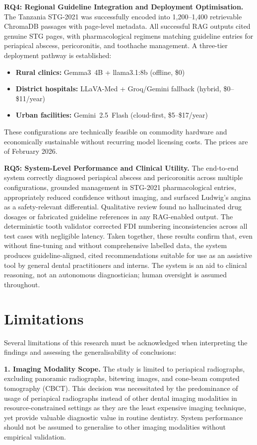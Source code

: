 \documentclass[12pt,a4paper]{report}
\begin{document}
\textbf{RQ4: Regional Guideline Integration and Deployment Optimisation.}
The Tanzania STG-2021 was successfully encoded into 1,200--1,400 retrievable
ChromaDB passages with page-level metadata. All successful RAG outputs cited
genuine STG pages, with pharmacological regimens matching guideline entries for
periapical abscess, pericoronitis, and toothache management. A three-tier
deployment pathway is established:
\begin{itemize}
  \item \textbf{Rural clinics:} Gemma3~4B + llama3.1:8b (offline, \$0)
  \item \textbf{District hospitals:} LLaVA-Med + Groq/Gemini fallback (hybrid,
        \$0--\$11/year)
  \item \textbf{Urban facilities:} Gemini~2.5~Flash (cloud-first,
        \$5--\$17/year)
\end{itemize}
These configurations are technically feasible on commodity hardware and
economically sustainable without recurring model licensing costs. The prices are of February 2026.

\textbf{RQ5: System-Level Performance and Clinical Utility.}
The end-to-end system correctly diagnosed periapical abscess and pericoronitis
across multiple configurations, grounded management in STG-2021 pharmacological
entries, appropriately reduced confidence without imaging, and surfaced Ludwig's
angina as a safety-relevant differential. Qualitative review found no hallucinated
drug dosages or fabricated guideline references in any RAG-enabled output. The
deterministic tooth validator corrected FDI numbering inconsistencies across
all test cases with negligible latency. Taken together, these results
confirm that, even without fine-tuning and without comprehensive labelled data,
the system produces guideline-aligned, cited recommendations suitable for use
as an assistive tool by general dental practitioners and interns. The system is
an aid to clinical reasoning, not an autonomous diagnostician; human oversight
is assumed throughout.


\section{Limitations}
\label{sec:limitations}

Several limitations of this research must be acknowledged when interpreting the findings and assessing the generalisability of conclusions:

\textbf{1. Imaging Modality Scope.} The study is limited to periapical radiographs, excluding panoramic radiographs, bitewing images, and cone-beam computed tomography (CBCT). This decision was necessitated by the predominance of usage of periapical radiographs instead of other dental imaging modalities in resource-constrained settings as they are the least expensive imaging technique, yet provide valuable diagnostic value in routine dentistry. System performance should not be assumed to generalise to other imaging modalities without empirical validation.
\end{document}

